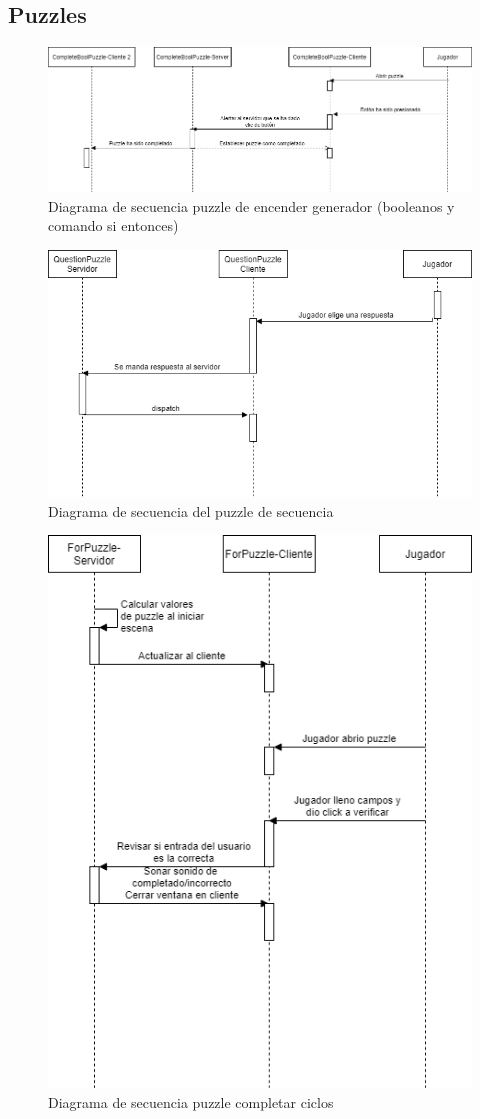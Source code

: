 \subsection{Puzzles}
        \begin{figure}[H]
        \centering
        \includegraphics[width=0.8\linewidth]{images/DiagramaSecuenciaPuzzleBool.png}
        \caption{Diagrama de secuencia puzzle de encender generador (booleanos y comando si entonces)}
        \label{fig:diagrama_sec_booleano}
    \end{figure}
        \begin{figure}[H]
        \centering
        \includegraphics[width=0.8\linewidth]{images/DiagramaSecuenciaPuzzleSecuencia.drawio.png}
        \caption{Diagrama de secuencia del puzzle de secuencia }
        \label{fig:diagrama_sec_sec}
    \end{figure}
        \begin{figure}[H]
        \centering
        \includegraphics[width=0.4\linewidth]{images/diagrama_sec_for_while.png}
        \caption{Diagrama de secuencia puzzle completar ciclos}
        \label{fig:diagrama_sec_for_while}
    \end{figure}
